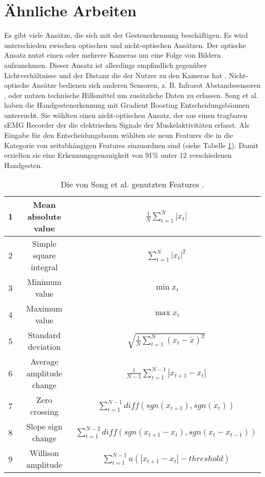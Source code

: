 \section{Ähnliche Arbeiten}
Es gibt viele Ansätze, die sich mit der Gestenerkennung beschäftigen. Es wird unterschieden zwischen optischen und nicht-optischen Ansätzen. Der optische Ansatz nutzt einen
oder mehrere Kameras um eine Folge von Bildern aufzunehmen. Dieser Ansatz ist allerdings empfindlich gegenüber Lichtverhältnisse und der Distanz die der
Nutzer zu den Kameras hat \cite{song2019design}. Nicht-optische Ansätze bedienen sich anderen Sensoren, z. B. Infrarot Abstandssensoren \cite{cheng2011contactless},
oder nutzen technische Hilfsmittel um zusätzliche Daten zu erfassen.
\newline
\newline
Song et al. \cite{song2019design} haben die Handgestenerkennung mit Gradient Boosting Entscheidungsbäumen untersucht. Sie wählten einen nicht-optischen Ansatz, der aus einen tragbaren sEMG Recorder
der die elektrischen Signale der Muskelaktivitäten erfasst. Als Eingabe für den Entscheidungsbaum wählten sie neun Features die in die Kategorie von zeitabhängigen Features einzuordnen sind
(siehe Tabelle \ref{tab:songFeatures}). Damit erzielten sie eine Erkennungsgenauigkeit von 91\% unter 12 verschiedenen Handgesten.
\begin{table}[h!]
    \centering
    \begin{tabular}{ c | c | c }
        \hline
        \hline
        1 & Mean absolute value & $\frac{1}{N}\sum^N_{t=1} |x_t|$ \\\hline
        2 & Simple square integral & $\sum^N_{t=1} |x_t|^2$ \\\hline
        3 & Minimum value & $\min x_t$ \\\hline
        4 & Maximum value & $\max x_t$ \\\hline
        5 & Standard deviation & $\sqrt{\frac{1}{N}\sum^N_{t=1}(x_t - \tilde{x})^2}$ \\\hline
        6 & Average amplitude change & $\frac{1}{N-1}\sum^{N-1}_{t=1} |x_{t + 1} - x_t|$ \\\hline
        7 & Zero crossing & $\sum^{N-1}_{t=1}diff(sgn(x_{t+1}),sgn(x_t))$ \\\hline
        8 & Slope sign change & $\sum^{N-2}_{t=1}diff(sgn(x_{t+1} - x_t),sgn(x_t - x_{t - 1}))$ \\\hline
        9 & Willison amplitude & $\sum^{N-1}_{t=1}u(|x_{t+1} - x_t| - threshold)$ \\
        \hline
        \hline
    \end{tabular}
    \caption{Die von Song et al. genutzten Features \cite{song2019design}.}
    \label{tab:songFeatures}
\end{table}
